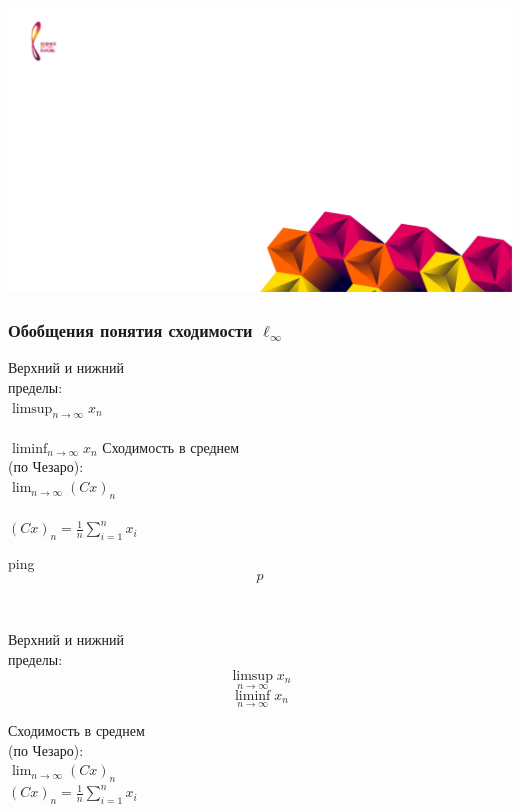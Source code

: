 \documentclass[10pt,pdf,hyperref={unicode},aspectratio=169]{beamer}
\theoremstyle{definition}
\begin{document}
{
	
}
{\includegraphics[width=\paperwidth,height=\paperheight,keepaspectratio]{bg.jpg}}


\begin{frame}
	\frametitle{Обобщения понятия сходимости $\ell_\infty$}
	{
		Верхний и нижний
		\\
		пределы:
		\\
		$\displaystyle \limsup_{n\to\infty} x_n$
		\\ \\
		$\displaystyle \liminf_{n\to\infty} x_n$
	}
	\hfill
	{
		Сходимость в среднем
		\\
		(по Чезаро):
		\\
		$\displaystyle \lim_{n\to\infty} (Cx)_n$
		\\\\
		$\displaystyle (Cx)_n = \frac1n\sum_{i=1}^n x_i$
	}
	\\
	\begin{varwidth}{10em}
		\centering
		ping
		\\
		$$p$$
	\end{varwidth}
	\\
	\begin{varwidth}{10em}
		\centering
		Верхний и нижний
		\\
		пределы:
		$$ \limsup_{n\to\infty} x_n$$
		$$\displaystyle \liminf_{n\to\infty} x_n$$
	\end{varwidth}
	\hfill
	\begin{varwidth}{10em}
		\centering
		Сходимость в среднем
		\\
		(по Чезаро):
		\\
		$\displaystyle \lim_{n\to\infty} (Cx)_n$
		\\
		$\displaystyle (Cx)_n = \frac1n\sum_{i=1}^n x_i$
	\end{varwidth}
\end{frame}
\end{document}
